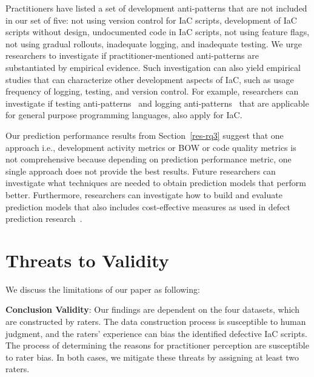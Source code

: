 \documentclass[smallextended]{svjour3}       %
\begin{document}
Practitioners have listed a set of development anti-patterns that are not included in our set of five: not using version control for IaC scripts, development of IaC scripts without design, undocumented code in IaC scripts, not using feature flags, not using gradual rollouts, inadequate logging, and inadequate testing. We urge researchers to investigate if practitioner-mentioned anti-patterns are substantiated by empirical evidence. Such investigation can also yield empirical studies that can characterize other development aspects of IaC, such as usage frequency of logging, testing, and version control. For example, researchers can investigate if testing anti-patterns~\citep{GAROUSI:TEST:SMELLS} and logging anti-patterns~\citep{chen:logging:smells} that are applicable for general purpose programming languages, also apply for IaC.  

Our prediction performance results from Section~\ref{res-rq3} suggest that one approach i.e., development activity metrics or BOW or code quality metrics is not comprehensive because depending on prediction performance metric, one single approach does not provide the best results. Future researchers can investigate what techniques are needed to obtain prediction models that perform better. Furthermore, researchers can investigate how to build and evaluate prediction models that also includes cost-effective measures as used in defect prediction research~\citep{lionel:jss:dp}.   






\section{Threats to Validity}
\label{threats}

We discuss the limitations of our paper as following:

\textbf{Conclusion Validity}: Our findings are dependent on the four datasets, which are constructed by raters. The data construction process is susceptible to human judgment, and the raters' experience can bias the identified defective IaC scripts. The process of determining the reasons for practitioner perception are susceptible to rater bias. In both cases, we mitigate these threats by assigning at least two raters. 
\end{document}
